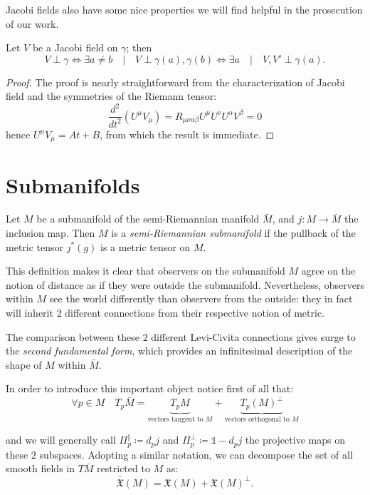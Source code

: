 Jacobi fields also have some nice properties we will find helpful in the prosecution of our work.
\begin{lemma}
	\label{lemma:Jacobi-fields-properties}
	Let \(V\) be a Jacobi field on \(\gamma\); then
	\[
	V \perp \gamma \iff \exists a\neq b \quad\vert\quad V\perp \gamma(a),\gamma(b) \iff \exists a \quad\vert\quad V, V' \perp \gamma(a).
	\]
\end{lemma}
\begin{proof}
	The proof is nearly straightforward from the characterization of Jacobi field and the symmetries of the Riemann tensor:
	\[
	\frac{d^2}{dt^2} (U^{\mu}V_{\mu}) = R_{\mu\nu\alpha\beta}U^{\mu}U^{\nu}U^{\alpha}V^{\beta} = 0
	\]
	hence \(U^{\mu}V_{\mu} = At + B\), from which the result is immediate.
\end{proof}


\section{Submanifolds}
\label{sec:submanifolds}

\begin{definition}
	Let \(M\) be a submanifold of the semi-Riemannian manifold \(\bar{M}\), and \(j:M\rightarrow\bar{M}\) the inclusion map. Then \(M\) is a \emph{semi-Riemannian submanifold} if the pullback of the metric tensor \(j^*(g)\) is a metric tensor on \(M\).
\end{definition}

This definition makes it clear that observers on the submanifold \(M\) agree on the notion of distance as if they were outside the submanifold. Nevertheless, observers within \(M\) see the world differently than observers from the outside: they in fact will inherit \(2\) different connections from their respective notion of metric. 

The comparison between these \(2\) different Levi-Civita connections gives surge to the \emph{second fundamental form}, which provides an infinitesimal description of the shape of \(M\) within \(\bar{M}\).

In order to introduce this important object notice first of all that:
\[
\forall p \in M \quad T_p\bar{M} = \underbrace{T_pM}_{\text{vectors tangent to }M}+ \underbrace{T_p(M)^{\perp}}_{\text{vectors orthogonal to } M}
\]

\noindent and we will generally call \(\Pi_p^{\parallel}\coloneqq d_pj\) and \(\Pi_p^{\perp}\coloneqq \mathbb{1} - d_pj\) the projective maps on these \(2\) subspaces.
Adopting a similar notation, we can decompose the set of all smooth fields in \(T\bar{M}\) restricted to \(M\) as:
\[
\bar{\mathfrak{X}}(M) = \mathfrak{X}(M) + \mathfrak{X}(M)^{\perp}.
\]

